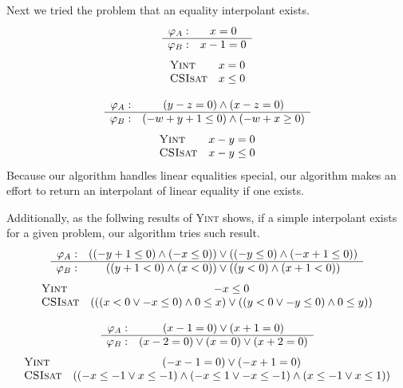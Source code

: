 Next we tried the problem that an equality interpolant exists.
\[\begin{array}{r c}
\varphi_A : & x=0 \\
\hline
\varphi_B : & x-1=0
\end{array}\]
\[\begin{array}{l c}
\text{\textsc{Yint}} & x=0 \\
\text{\textsc{CSIsat}} & x \leq 0
\end{array}\]

\bigskip\centerline{}

\[\begin{array}{r c}
\varphi_A : & (y-z=0) \wedge (x-z=0) \\
\hline
\varphi_B : & (-w+y+1 \leq 0) \wedge (-w+x \geq 0)
\end{array}\]
\[\begin{array}{l c}
\text{\textsc{Yint}} & x-y=0 \\
\text{\textsc{CSIsat}} & x-y \leq 0
\end{array}\]
Because our algorithm handles linear equalities special, our algorithm
makes an effort to return an interpolant of linear equality if one
exists.

Additionally, as the follwing results of \textsc{Yint} shows, if a
simple interpolant exists for a given problem, our algorithm tries
such result.
\[\begin{array}{r c}
\varphi_A : & ((-y+1 \leq 0) \wedge (-x \leq 0)) \vee ((-y \leq 0) \wedge (-x+1 \leq 0)) \\
\hline
\varphi_B : & ((y+1<0) \wedge (x<0)) \vee ((y<0) \wedge (x+1<0))
\end{array}\]
\[\begin{array}{l c}
\text{\textsc{Yint}} & -x \leq 0 \\
\text{\textsc{CSIsat}} & (((x < 0 \vee -x \leq 0) \wedge 0 \leq x) \vee ((y < 0 \vee -y \leq 0) \wedge 0 \leq y))
\end{array}\]

\bigskip\centerline{}

\[\begin{array}{r c}
\varphi_A : & (x-1=0) \vee (x+1=0) \\
\hline
\varphi_B : & (x-2=0) \vee (x=0) \vee (x+2=0)
\end{array}\]
\[\begin{array}{l c}
\text{\textsc{Yint}} & (-x-1=0) \vee (-x+1=0) \\
\text{\textsc{CSIsat}} & ((-x \leq -1 \vee x \leq -1) \wedge (-x \leq 1 \vee - x \leq - 1) \wedge (x \leq - 1 \vee x \leq 1))
\end{array}\]

